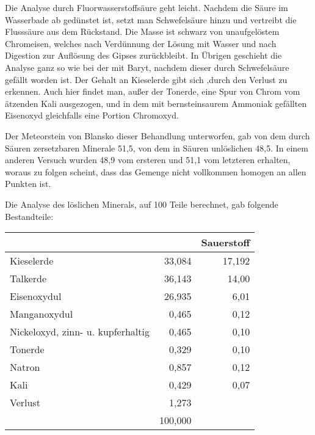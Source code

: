 \documentclass[a4paper, 11pt, oneside]{article}
\begin{document}
Die Analyse durch Fluorwasserstoffsäure geht leicht. Nachdem die Säure im Wasserbade ab gedünstet ist, setzt man Schwefelsäure hinzu und vertreibt die Flusssäure aus dem Rückstand. Die Masse ist schwarz von unaufgelöstem Chromeisen, welches nach Verdünnung der Lösung mit Wasser und nach Digestion zur Auflösung des Gipses zurückbleibt. In Übrigen geschieht die Analyse ganz so wie bei der mit Baryt, nachdem dieser durch Schwefelsäure gefällt worden ist. Der Gehalt an Kieselerde gibt sich ‚durch den Verlust zu erkennen. Auch hier findet man, außer der Tonerde, eine Spur von Chrom vom ätzenden Kali ausgezogen, und in dem mit bernsteinsaurem Ammoniak gefällten Eisenoxyd gleichfalls eine Portion Chromoxyd.

Der Meteorstein von Blansko dieser Behandlung unterworfen, gab von dem durch Säuren zersetzbaren Minerale 51,5, von dem in Säuren unlöslichen 48,5. In einem anderen Versuch wurden 48,9 vom ersteren und 51,1 vom letzteren erhalten, woraus zu folgen scheint, dass das Gemenge nicht vollkommen homogen an allen Punkten ist.

Die Analyse des löslichen Minerals, auf 100 Teile berechnet, gab folgende Bestandteile:
\begin{center}
\begin{tabular}{ |l|r|r| }
    \hline
     & & Sauerstoff\\\hline
    Kieselerde & 33,084 & 17,192\\\hline
    Talkerde & 36,143 & 14,00\\\hline
    Eisenoxydul & 26,935 & 6,01\\\hline
    Manganoxydul & 0,465 & 0,12\\\hline
    Nickeloxyd, zinn- u. kupferhaltig & 0,465 & 0,10\\\hline
    Tonerde & 0,329 & 0,10\\\hline
    Natron & 0,857 & 0,12\\\hline
    Kali & 0,429 & 0,07\\\hline
    Verlust & 1,273 & \\\hline
     & 100,000 & \\
    \hline
\end{tabular}
\end{center}
\end{document}
